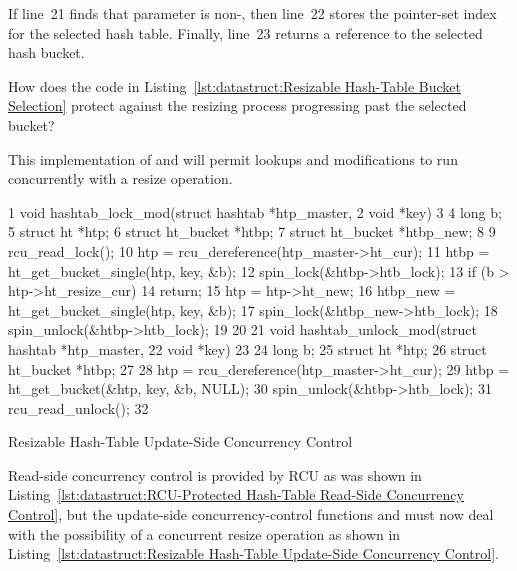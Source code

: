If line~21 finds that parameter  is non-, then
line~22 stores the pointer-set index for the selected hash table.
Finally, line~23 returns a reference to the selected hash bucket.

\QuickQuiz{}
	How does the code in
	Listing~\ref{lst:datastruct:Resizable Hash-Table Bucket Selection}
	protect against the resizing process progressing past the
	selected bucket?
 \QuickQuizEnd

This implementation of
 and 
will permit lookups and modifications to run concurrently
with a resize operation.

\begin{listing}[tb]
{ \scriptsize
\begin{verbbox}
 1 void hashtab_lock_mod(struct hashtab *htp_master,
 2                       void *key)
 3 {
 4   long b;
 5   struct ht *htp;
 6   struct ht_bucket *htbp;
 7   struct ht_bucket *htbp_new;
 8 
 9   rcu_read_lock();
10   htp = rcu_dereference(htp_master->ht_cur);
11   htbp = ht_get_bucket_single(htp, key, &b);
12   spin_lock(&htbp->htb_lock);
13   if (b > htp->ht_resize_cur)
14     return;
15   htp = htp->ht_new;
16   htbp_new = ht_get_bucket_single(htp, key, &b);
17   spin_lock(&htbp_new->htb_lock);
18   spin_unlock(&htbp->htb_lock);
19 }
20 
21 void hashtab_unlock_mod(struct hashtab *htp_master,
22                         void *key)
23 {
24   long b;
25   struct ht *htp;
26   struct ht_bucket *htbp;
27 
28   htp = rcu_dereference(htp_master->ht_cur);
29   htbp = ht_get_bucket(&htp, key, &b, NULL);
30   spin_unlock(&htbp->htb_lock);
31   rcu_read_unlock();
32 }
\end{verbbox}
}
\centering
\theverbbox
\caption{Resizable Hash-Table Update-Side Concurrency Control}
\label{lst:datastruct:Resizable Hash-Table Update-Side Concurrency Control}
\end{listing}

Read-side concurrency control is provided by RCU as was shown in
Listing~\ref{lst:datastruct:RCU-Protected Hash-Table Read-Side Concurrency Control},
but the update-side concurrency-control functions
 and 
must now deal with the possibility of a
concurrent resize operation as shown in
Listing~\ref{lst:datastruct:Resizable Hash-Table Update-Side Concurrency Control}.

